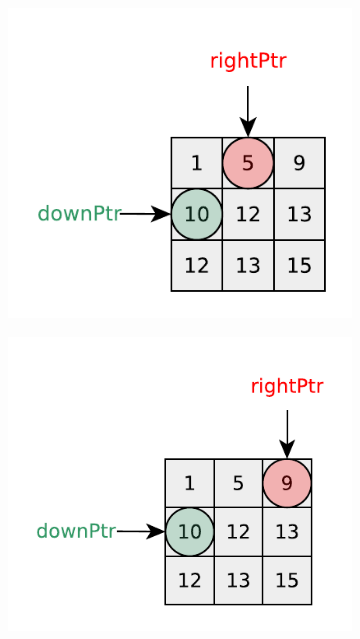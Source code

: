 \begin{figure}
	\centering
	\begin{subfigure}[t]{0.32\textwidth}
		\includegraphics[width=1\linewidth]{sources/kth_smallest_in_sorted_matrix/images/visit1}
		\caption{}
		\label{fig:kth_smallest_in_sorted_matrix:visit1}
	 \end{subfigure}
	\hfill
	\begin{subfigure}[t]{0.32\textwidth}
		\includegraphics[width=1\linewidth]{sources/kth_smallest_in_sorted_matrix/images/visit2}

\end{subfigure}
\end{figure}
